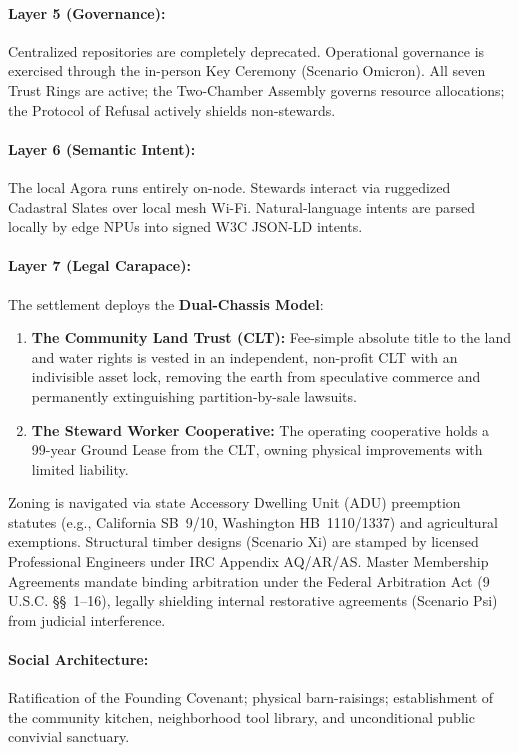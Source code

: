 \paragraph{Layer 5 (Governance):} Centralized repositories are completely deprecated. Operational governance is exercised through the in-person Key Ceremony (Scenario Omicron). All seven Trust Rings are active; the Two-Chamber Assembly governs resource allocations; the Protocol of Refusal actively shields non-stewards.
\paragraph{Layer 6 (Semantic Intent):} The local Agora runs entirely on-node. Stewards interact via ruggedized Cadastral Slates over local mesh Wi-Fi. Natural-language intents are parsed locally by edge NPUs into signed W3C JSON-LD intents.
\paragraph{Layer 7 (Legal Carapace):} The settlement deploys the \textbf{Dual-Chassis Model}:
\begin{enumerate}
    \item \textbf{The Community Land Trust (CLT):} Fee-simple absolute title to the land and water rights is vested in an independent, non-profit CLT with an indivisible asset lock, removing the earth from speculative commerce and permanently extinguishing partition-by-sale lawsuits.
    \item \textbf{The Steward Worker Cooperative:} The operating cooperative holds a 99-year Ground Lease from the CLT, owning physical improvements with limited liability.
\end{enumerate}
Zoning is navigated via state Accessory Dwelling Unit (ADU) preemption statutes (e.g., California SB~9/10, Washington HB~1110/1337) and agricultural exemptions. Structural timber designs (Scenario Xi) are stamped by licensed Professional Engineers under IRC Appendix AQ/AR/AS. Master Membership Agreements mandate binding arbitration under the Federal Arbitration Act (9 U.S.C. \S\S~1--16), legally shielding internal restorative agreements (Scenario Psi) from judicial interference.
\paragraph{Social Architecture:} Ratification of the Founding Covenant; physical barn-raisings; establishment of the community kitchen, neighborhood tool library, and unconditional public convivial sanctuary.


